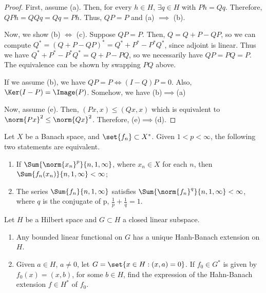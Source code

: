 \documentclass[12pt,letterpaper,twoside]{hmcpset}
\begin{document}
\begin{solution}
  \begin{proof}
    First, assume (a).
    Then, for every $h \in H$, $\exists q \in H$ with $Ph = Qq$.
    Therefore, $QPh = QQq = Qq = Ph$.
    Thus, $QP = P$ and (a) $\implies$ (b).

    Now, we show (b) $\Leftrightarrow$ (c).
    Suppose $QP = P$.
    Then, $Q = Q + P - QP$, so we can compute $Q^* = (Q + P - QP)^* = Q^* + P^* - P^*Q^*$, since adjoint is linear.
    Thus we have $Q^* + P^* - P^*Q^* = Q + P - PQ$, so we necessarily have $QP = PQ = P$.
    The equivalence can be shown by swapping $PQ$ above.
    
    If we assume (b), we have $QP = P \Leftrightarrow (I - Q)P = 0$.
    Also, $\Ker(I-P) = \Image(P)$.
    Somehow, we have (b)$\implies$(a)

    Now, assume (e).
    Then, $(Px,x) \leq (Qx,x)$ which is equivalent to $\norm{Px}^2 \leq \norm{Qx}^2$.
    Therefore, (e)$\implies$(d).
  \end{proof}
\end{solution}
\begin{problem}[3][15]
  Let $X$ be a Banach space, and $\set{f_n} \subset X^*$.  Given $1 < p < \infty$, the following two statements are equivalent.
  \begin{enumerate}[label=(\alph*)]
  \item If $\Sum{\norm{x_n}^p}{n,1,\infty}$, where $x_n \in X$ for each $n$, then $\Sum{f_n(x_n)}{n,1,\infty} < \infty$;
  \item The series $\Sum{f_n}{n,1,\infty}$ satisfies $\Sum{\norm{f_n}^q}{n,1,\infty} < \infty$, where $q$ is the conjugate of p, \ie{} $\frac{1}{p} + \frac{1}{q} = 1$. 
  \end{enumerate}

\end{problem}

\begin{solution}
  
\end{solution}
\begin{problem}[4][15]
  Let $H$ be a Hilbert space and $G \subset H$ a closed linear subspace.
  \begin{enumerate}[label=(\alph*)]
  \item Any bounded linear functional on $G$ has a unique Hanh-Banach extension on $H$.
  \item Given $a \in H$, $a \not= 0$, let $G = \set{x \in H : (x,a) = 0}$.
    If $f_0 \in G^*$ is given by $f_0(x) = (x,b)$, for some $b \in H$, find the expression of the Hahn-Banach extension $f \in H^*$ of $f_0$.
  \end{enumerate}
\end{problem}
\end{document}

